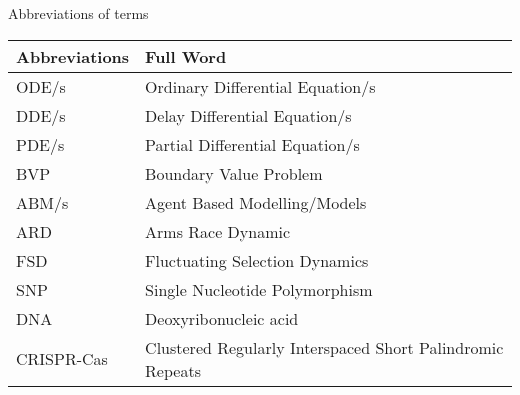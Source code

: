 Abbreviations of terms

\begin{table}[ht!]
    \begin{tabular}{|l|l|}
        \hline
        Abbreviations & Full Word                         \\ \hline
        ODE/s         & Ordinary Differential Equation/s \\ \hline
        DDE/s         & Delay Differential Equation/s \\ \hline
        PDE/s         & Partial Differential Equation/s \\ \hline
        BVP  & Boundary Value Problem \\ \hline
        ABM/s  & Agent Based Modelling/Models \\ \hline
        ARD  & Arms Race Dynamic \\ \hline
        FSD  & Fluctuating Selection Dynamics \\ \hline
        SNP  & Single Nucleotide Polymorphism \\ \hline
        DNA  & Deoxyribonucleic acid \\ \hline
        CRISPR-Cas & Clustered Regularly Interspaced Short Palindromic Repeats \\ \hline
    \end{tabular}
\end{table}
